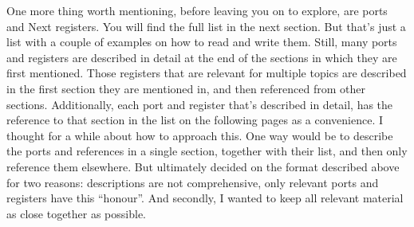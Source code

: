 One more thing worth mentioning, before leaving you on to explore, are ports and Next registers. You will find the full list in the next section. But that's just a list with a couple of examples on how to read and write them. Still, many ports and registers are described in detail at the end of the sections in which they are first mentioned. Those registers that are relevant for multiple topics are described in the first section they are mentioned in, and then referenced from other sections. Additionally, each port and register that's described in detail, has the reference to that section in the list on the following pages as a convenience. I thought for a while about how to approach this. One way would be to describe the ports and references in a single section, together with their list, and then only reference them elsewhere. But ultimately decided on the format described above for two reasons: descriptions are not comprehensive, only relevant ports and registers have this ``honour''. And secondly, I wanted to keep all relevant material as close together as possible.

\pagebreak
\pagestyle{clean} %
